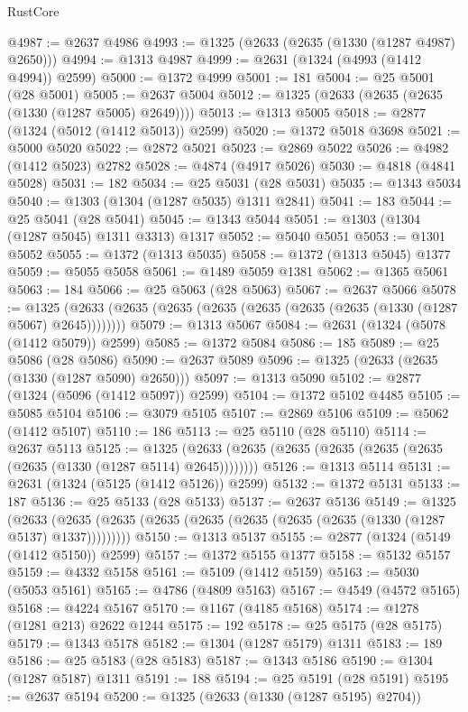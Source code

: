 \begin{lexlean}{RustCore}
\begin{coremodule}
@4987 := @2637 @4986
@4993 := @1325 (@2633 (@2635 (@1330 (@1287 @4987) @2650)))
@4994 := @1313 @4987
@4999 := @2631 (@1324 (@4993 (@1412 @4994)) @2599)
@5000 := @1372 @4999
@5001 := 181
@5004 := @25 @5001 (@28 @5001)
@5005 := @2637 @5004
@5012 := @1325 (@2633 (@2635 (@2635 (@1330 (@1287 @5005) @2649))))
@5013 := @1313 @5005
@5018 := @2877 (@1324 (@5012 (@1412 @5013)) @2599)
@5020 := @1372 @5018 @3698
@5021 := @5000 @5020
@5022 := @2872 @5021
@5023 := @2869 @5022
@5026 := @4982 (@1412 @5023) @2782
@5028 := @4874 (@4917 @5026)
@5030 := @4818 (@4841 @5028)
@5031 := 182
@5034 := @25 @5031 (@28 @5031)
@5035 := @1343 @5034
@5040 := @1303 (@1304 (@1287 @5035) @1311 @2841)
@5041 := 183
@5044 := @25 @5041 (@28 @5041)
@5045 := @1343 @5044
@5051 := @1303 (@1304 (@1287 @5045) @1311 @3313) @1317
@5052 := @5040 @5051
@5053 := @1301 @5052
@5055 := @1372 (@1313 @5035)
@5058 := @1372 (@1313 @5045) @1377
@5059 := @5055 @5058
@5061 := @1489 @5059 @1381
@5062 := @1365 @5061
@5063 := 184
@5066 := @25 @5063 (@28 @5063)
@5067 := @2637 @5066
@5078 := @1325 (@2633 (@2635 (@2635 (@2635 (@2635 (@2635 (@2635 (@1330 (@1287 @5067) @2645))))))))
@5079 := @1313 @5067
@5084 := @2631 (@1324 (@5078 (@1412 @5079)) @2599)
@5085 := @1372 @5084
@5086 := 185
@5089 := @25 @5086 (@28 @5086)
@5090 := @2637 @5089
@5096 := @1325 (@2633 (@2635 (@1330 (@1287 @5090) @2650)))
@5097 := @1313 @5090
@5102 := @2877 (@1324 (@5096 (@1412 @5097)) @2599)
@5104 := @1372 @5102 @4485
@5105 := @5085 @5104
@5106 := @3079 @5105
@5107 := @2869 @5106
@5109 := @5062 (@1412 @5107)
@5110 := 186
@5113 := @25 @5110 (@28 @5110)
@5114 := @2637 @5113
@5125 := @1325 (@2633 (@2635 (@2635 (@2635 (@2635 (@2635 (@2635 (@1330 (@1287 @5114) @2645))))))))
@5126 := @1313 @5114
@5131 := @2631 (@1324 (@5125 (@1412 @5126)) @2599)
@5132 := @1372 @5131
@5133 := 187
@5136 := @25 @5133 (@28 @5133)
@5137 := @2637 @5136
@5149 := @1325
    (@2633 (@2635 (@2635 (@2635 (@2635 (@2635 (@2635 (@2635 (@1330 (@1287 @5137) @1337)))))))))
@5150 := @1313 @5137
@5155 := @2877 (@1324 (@5149 (@1412 @5150)) @2599)
@5157 := @1372 @5155 @1377
@5158 := @5132 @5157
@5159 := @4332 @5158
@5161 := @5109 (@1412 @5159)
@5163 := @5030 (@5053 @5161)
@5165 := @4786 (@4809 @5163)
@5167 := @4549 (@4572 @5165)
@5168 := @4224 @5167
@5170 := @1167 (@4185 @5168)
@5174 := @1278 (@1281 @213) @2622 @1244
@5175 := 192
@5178 := @25 @5175 (@28 @5175)
@5179 := @1343 @5178
@5182 := @1304 (@1287 @5179) @1311
@5183 := 189
@5186 := @25 @5183 (@28 @5183)
@5187 := @1343 @5186
@5190 := @1304 (@1287 @5187) @1311
@5191 := 188
@5194 := @25 @5191 (@28 @5191)
@5195 := @2637 @5194
@5200 := @1325 (@2633 (@1330 (@1287 @5195) @2704))

\end{coremodule}
\end{lexlean}
